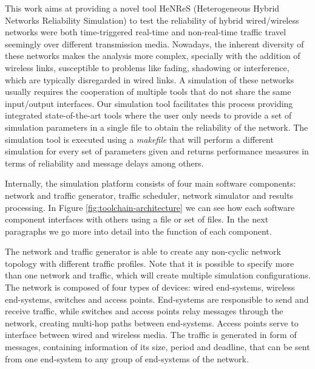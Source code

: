 \documentclass[conference]{IEEEtran}
\begin{document}

This work aims at providing a novel tool HeNReS (Heterogeneous Hybrid Networks Reliability Simulation) to test the reliability of hybrid wired/wireless networks were both time-triggered real-time and non-real-time traffic travel seemingly over different transmission media. Nowadays, the inherent diversity of these networks makes the analysis more complex, specially with the addition of wireless links, susceptible to problems like fading, shadowing or interference, which are typically disregarded in wired links. A simulation of these networks usually requires the cooperation of multiple tools that do not share the same input/output interfaces. Our simulation tool facilitates this process providing integrated state-of-the-art tools where the user only needs to provide a set of simulation parameters in a single file to obtain the reliability of the network. The simulation tool is executed using a \textit{makefile} that will perform a different simulation for every set of parameters given and returns performance measures in terms of reliability and message delays among others.




Internally, the simulation platform consists of four main software components: network and traffic generator, traffic scheduler, network simulator and results processing. In Figure \ref{fig:toolchain-architecture} we can see how each software component interfaces with others using a file or set of files. In the next paragraphs we go more into detail into the function of each component.

The network and traffic generator is able to create any non-cyclic network topology with different traffic profiles. Note that it is possible to specify more than one network and traffic, which will create multiple simulation configurations. The network is composed of four types of devices: wired end-systems, wireless end-systems, switches and access points. End-systems are responsible to send and receive traffic, while switches and access points relay messages through the network, creating multi-hop paths between end-systems. Access points serve to interface between wired and wireless media. The traffic is generated in form of messages, containing information of its size, period and deadline, that can be sent from one end-system to any group of end-systems of the network.
\end{document}
